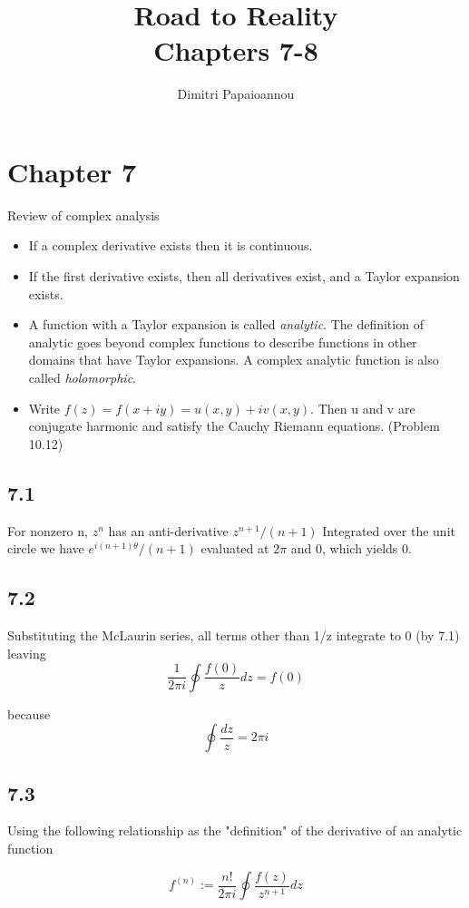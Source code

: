 \documentclass[]{article}
\title{Road to Reality\\Chapters 7-8}
\author{Dimitri Papaioannou}
\begin{document}
\maketitle


\section*{Chapter 7}

Review of complex analysis

\begin{itemize}
\item If a complex derivative exists then it is continuous. 
\item If the first derivative exists, then all derivatives exist, and a Taylor expansion exists.
\item A function with a Taylor expansion is called \textit{analytic}. The definition of analytic goes beyond complex functions to describe functions in other domains that have Taylor expansions. A complex analytic function is also called \textit{holomorphic}.
\item Write $f(z)= f(x+iy) = u(x,y)+iv(x,y)$. Then u and v are conjugate harmonic and satisfy the Cauchy Riemann equations. (Problem 10.12)
\end{itemize}

\subsection*{7.1}
For nonzero n, $z^n$ has an anti-derivative $z^{n+1}/(n+1)$
Integrated over the unit circle we have $e^{i(n+1)\theta}/(n+1)$
evaluated at $2\pi$ and $0$, which yields 0. 

\subsection*{7.2}
Substituting the McLaurin series, all terms other than 1/z integrate to 0 (by 7.1) leaving 
$$
\frac{1}{2\pi i} \oint \frac{f(0)}{z}dz = f(0)
$$

because 
$$
\oint \frac{dz}{z} = 2\pi i
$$


\subsection*{7.3}
Using the following relationship as the "definition" of the derivative of an analytic function

\begin{equation}
f^{(n)} := \frac{n!}{2\pi i}\oint \frac{f(z)}{z^{n+1}}dz
\end{equation}
\end{document}
